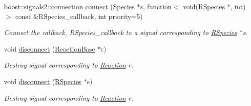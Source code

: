 \begin{DoxyCompactItemize}
boost\+::signals2\+::connection \hyperlink{classChemSignal_ad6c0c03f2cb4a12a870d356e72ca2163}{connect} (\hyperlink{classSpecies}{Species} $\ast$s, function$<$ void(\hyperlink{classRSpecies}{R\+Species} $\ast$, int)$>$ const \&R\+Species\+\_\+callback, int priority=5)
\begin{DoxyCompactList}\small\item\em Connect the callback, R\+Species\+\_\+callback to a signal corresponding to \hyperlink{classRSpecies}{R\+Species} $\ast$s. \end{DoxyCompactList}\item 
void \hyperlink{classChemSignal_a1e7e140afc97679d20371f0dd456c5f1}{disconnect} (\hyperlink{classReactionBase}{Reaction\+Base} $\ast$r)
\begin{DoxyCompactList}\small\item\em Destroy signal corresponding to \hyperlink{classReaction}{Reaction} r. \end{DoxyCompactList}\item 
void \hyperlink{classChemSignal_a7c0fcba3edac3e3f222bedefd0825fcb}{disconnect} (\hyperlink{classRSpecies}{R\+Species} $\ast$s)
\begin{DoxyCompactList}\small\item\em Destroy signal corresponding to \hyperlink{classReaction}{Reaction} r. \end{DoxyCompactList}\end{DoxyCompactItemize}
